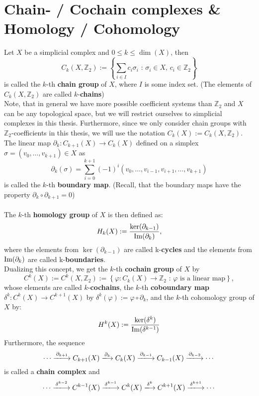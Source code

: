 \section*{Chain- / Cochain complexes \& Homology / Cohomology}

Let \(X\) be a simplicial complex and \(0\leq k\leq \dim(X)\), then
\[
C_k(X,\mathbb{Z}_2):=\left\{\sum\limits_{i\in I}c_i\sigma_i\text{ : }\sigma_i\in X\text{, }c_i\in\mathbb{Z}_2\right\}
\]
is called the \(k\)-th \textbf{chain group} of \(X\), where \(I\) is some index set. (The elements of \(C_k(X,\mathbb{Z}_2)\) are called \(k\)-\textbf{chains})\\
Note, that in general we have more possible coefficient systems than \(\mathbb{Z}_2\) and \(X\) can be any topological space, but we will restrict ourselves to simplicial complexes in this thesis. Furthermore, since we only consider chain groups with \(\mathbb{Z}_2\)-coefficients in this thesis, we will use the notation \(C_k(X):=C_k(X,\mathbb{Z}_2)\).\\
The linear map \(\partial_k:C_{k+1}(X)\rightarrow C_k(X)\) defined on a simplex \(\sigma=(v_0,\ldots,v_{k+1})\in X\) as
\[
\partial_k(\sigma)=\sum\limits_{i=0}^{k+1}(-1)^i(v_0,\ldots,v_{i-1},v_{i+1},\ldots,v_{k+1})
\]
is called the \(k\)-th \textbf{boundary map}. (Recall, that the boundary maps have the property \(\partial_k\circ\partial_{k+1}=0\))\\
\\
The \(k\)-th \textbf{homology group} of \(X\) is then defined as:
\[
H_k(X):=\frac{\ker(\partial_{k-1})}{\mathrm{Im}(\partial_k)},
\]
where the elements from \(\ker(\partial_{k-1})\) are called k-\textbf{cycles} and the elements from \(\mathrm{Im}(\partial_k)\) are called k-\textbf{boundaries}.\\
Dualizing this concept, we get the \(k\)-th \textbf{cochain group} of \(X\) by
\[
C^k(X):=C^k(X,\mathbb{Z}_2):=\left\{\varphi:C_k(X)\rightarrow\mathbb{Z}_2\text{ : }\varphi\text{ is a linear map}\right\},
\]
whose elements are called \(k\)-\textbf{cochains}, the \(k\)-th \textbf{coboundary map}\\
\(\delta^k:C^k(X)\rightarrow C^{k+1}(X)\) by \(\delta^k(\varphi):=\varphi\circ\partial_k\), and the \(k\)-th cohomology group of \(X\) by:
\[
H^k(X):=\frac{\ker(\delta^k)}{\mathrm{Im}(\delta^{k-1})}
\]
Furthermore, the sequence
\[
\cdots\xlongrightarrow{\partial_{k+1}} C_{k+1}(X)\xlongrightarrow{\partial_k} C_k(X)\xlongrightarrow{\partial_{k-1}} C_{k-1}(X)\xlongrightarrow{\partial_{k-2}}\cdots
\]
is called a \textbf{chain complex} and
\[
\cdots\xlongrightarrow{\delta^{k-2}} C^{k-1}(X)\xlongrightarrow{\delta^{k-1}} C^k(X)\xlongrightarrow{\delta^k} C^{k+1}(X)\xlongrightarrow{\delta^{k+1}}\cdots
\]
